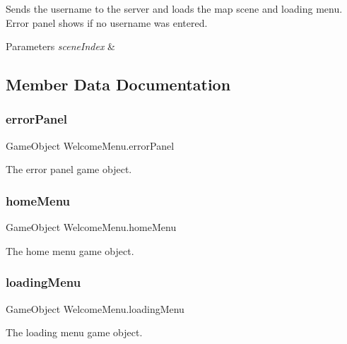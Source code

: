 Sends the username to the server and loads the map scene and loading menu. Error panel shows if no username was entered. 


\begin{DoxyParams}{Parameters}
{\em scene\+Index} & \\
\hline
\end{DoxyParams}


\subsection{Member Data Documentation}
\mbox{\label{class_welcome_menu_a61a3e2ae97be88313e06aed7e65b9af4}} 
\subsubsection{\texorpdfstring{errorPanel}{errorPanel}}
{\footnotesize\ttfamily Game\+Object Welcome\+Menu.\+error\+Panel}



The error panel game object. 

\mbox{\label{class_welcome_menu_a9fca6731d74309a517ff9e027c2eb7f3}} 
\subsubsection{\texorpdfstring{homeMenu}{homeMenu}}
{\footnotesize\ttfamily Game\+Object Welcome\+Menu.\+home\+Menu}



The home menu game object. 

\mbox{\label{class_welcome_menu_ab63c6cc689c30a12f0e3e00cc5b584e8}} 
\subsubsection{\texorpdfstring{loadingMenu}{loadingMenu}}
{\footnotesize\ttfamily Game\+Object Welcome\+Menu.\+loading\+Menu}



The loading menu game object. 

